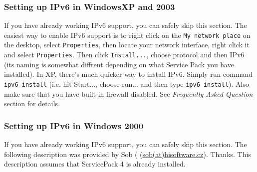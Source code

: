 \subsubsection{Setting up IPv6 in WindowsXP and 2003}
If you have already working IPv6 support, you can safely skip this section.
The easiest way to enable IPv6 support is to right click on the
\verb+My network place+ on the desktop, select \verb+Properties+, then locate
your network interface, right click it and select \verb+Properties+. Then
click \verb+Install...+, choose protocol and then IPv6 (its naming is
somewhat diffrent depending on what Service Pack you have installed).
In XP, there's much quicker way to install IPv6. Simply run command
\verb+ipv6 install+ (i.e. hit Start..., choose run... and then type 
\verb+ipv6 install+). Also make sure that you have built-in firewall
disabled. See \emph{Frequently Asked Question} section for details.

\subsubsection{Setting up IPv6 in Windows 2000}
If you have already working IPv6 support, you can safely skip this
section. The following description was provided by Sob (
(\href{mailto:sob(at)hisoftware.cz}{sob(at)hisoftware.cz}). Thanks. This
description assumes that ServicePack 4 is already installed.

